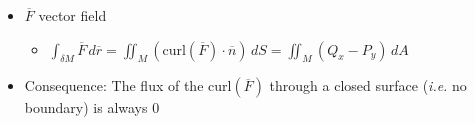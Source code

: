 \begin{itemize}
\begin{itemize}
    \end{itemize}

  \item $\overline{F}$ vector field

    \begin{itemize}

      \item $\displaystyle \int_{\delta M} \overline{F}\,d\overline{r}=\iint_M (\text{curl}(\overline{F})\cdot\overline{n})\,dS=\iint_M (Q_x-P_y)\,dA$

    \end{itemize}

  \item Consequence: The flux of the curl$(\overline{F})$ through a closed surface (\textit{i.e.} no boundary) is always 0

\end{itemize}



